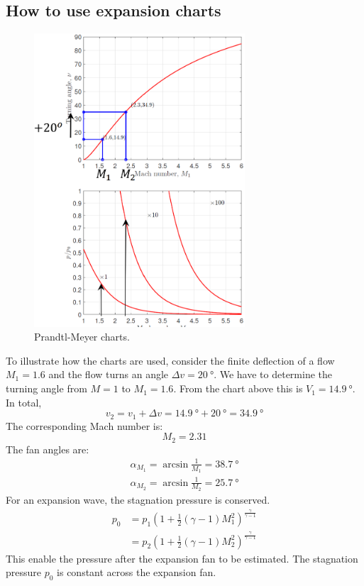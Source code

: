 \documentclass[class=report, crop=false, 12pt,a4paper]{standalone}
\begin{document}
\subsection{How to use expansion charts}
\begin{figure}[H]
    \centering
    \includegraphics[width = 0.7\textwidth]{../img/diagram26.png}
    \caption{Prandtl-Meyer charts.}
\end{figure}
To illustrate how the charts are used, consider the finite deflection of a flow $M_1 = 1.6$ and the flow turns an angle $\Delta v = \SI{20}{\degree}$. We have to determine the turning angle from $M= 1$ to $M_1 = 1.6$. From the chart above this is $V_1 = \SI{14.9}{\degree}$. In total,
\begin{equation}
    v_2 = v_1 + \Delta v = \SI{14.9}{\degree} + \SI{20}{\degree} = \SI{34.9}{\degree}
\end{equation}
The corresponding Mach number is:
\begin{equation}
    M_2 = 2.31
\end{equation}
The fan angles are:
\begin{align}
    \alpha_{M_1} = \arcsin \frac{1}{M_1} = \SI{38.7}{\degree} \\
    \alpha_{M_2} = \arcsin \frac{1}{M_2} = \SI{25.7}{\degree}
\end{align}
For an expansion wave, the stagnation pressure is conserved.
\begin{align}
    p_0 & = p_1 \left(1 + \frac{1}{2}\left(\gamma - 1\right)M^2_1\right)^{\frac{\gamma}{\gamma -1}}  \\
        & = p_2 \left(1 + \frac{1}{2}\left(\gamma - 1\right)M^2_2\right)^{\frac{\gamma}{\gamma - 1}}
\end{align}
This enable the pressure after the expansion fan to be estimated. The stagnation pressure $p_0$ is constant across the expansion fan.
\end{document}

